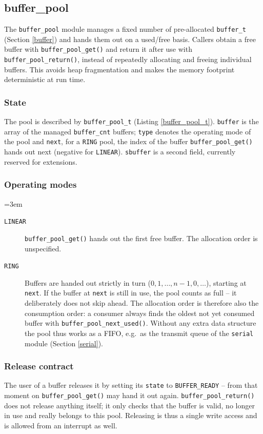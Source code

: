 \subsection{buffer\_pool}\label{buffer_pool}
The \verb|buffer_pool| module manages a fixed number of pre-allocated
\verb|buffer_t| (Section \ref{buffer}) and hands them out on a used/free
basis. Callers obtain a free buffer with \verb|buffer_pool_get()| and return
it after use with \verb|buffer_pool_return()|, instead of repeatedly
allocating and freeing individual buffers. This avoids heap fragmentation and
makes the memory footprint deterministic at run time.

\subsubsection*{State}
The pool is described by \verb|buffer_pool_t| (Listing \ref{buffer_pool_t}).
\verb|buffer| is the array of the managed \verb|buffer_cnt| buffers;
\verb|type| denotes the operating mode of the pool and \verb|next|, for a
\verb|RING| pool, the index of the buffer \verb|buffer_pool_get()| hands out
next (negative for \verb|LINEAR|). \verb|sbuffer| is a second field,
currently reserved for extensions.

\subsubsection*{Operating modes}
{\sloppy\emergencystretch=3em
\begin{description}
\item[\texttt{LINEAR}] \verb|buffer_pool_get()| hands out the first free
  buffer. The allocation order is unspecified.
\item[\texttt{RING}] Buffers are handed out strictly in turn
  ($0, 1, \dots, n-1, 0, \dots$), starting at \verb|next|. If the buffer at
  \verb|next| is still in use, the pool counts as full -- it deliberately does
  not skip ahead. The allocation order is therefore also the consumption
  order: a consumer always finds the oldest not yet consumed buffer with
  \verb|buffer_pool_next_used()|. Without any extra data structure the pool
  thus works as a FIFO, e.g.\ as the transmit queue of the \verb|serial|
  module (Section \ref{serial}).
\end{description}
\par}

\subsubsection*{Release contract}
The user of a buffer releases it by setting its \verb|state| to
\verb|BUFFER_READY| -- from that moment on \verb|buffer_pool_get()| may hand
it out again. \verb|buffer_pool_return()| does not release anything itself;
it only checks that the buffer is valid, no longer in use and really belongs
to this pool. Releasing is thus a single write access and is allowed from an
interrupt as well.


